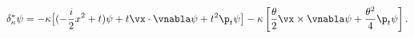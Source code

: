 \begin{equation}
     \delta^*_{\kappa}\psi=-\kappa\big[(-\frac{i}{2}x^2+t)\psi
+t\vx\cdot\vnabla\psi+t^2\p_{t}\psi\big]
-\kappa\left[
\frac{\theta}{2}\vx\times\vnabla\psi+\frac{\theta^2}{4}
\p_{t}\psi\right].
\label{exexp}
\end{equation}


